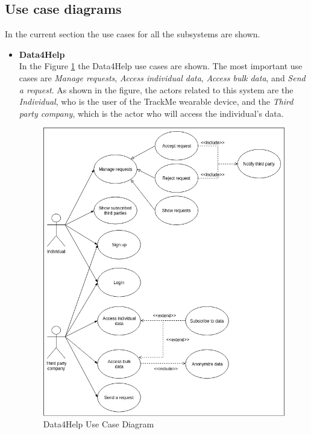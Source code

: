 \documentclass[hidelinks, 12pt]{report}
\begin{document}
	\subsection{Use case diagrams}
	In the current section the use cases for all the subsystems are shown.
	
	\begin{itemize}
		\item{\textbf{Data4Help}} \\
		In the Figure \ref{fig:d4h_use_cases} the Data4Help use cases are shown. The most important use cases are \textit{Manage requests}, \textit{Access individual data}, \textit{Access bulk data}, and \textit{Send a request}. As shown in the figure, the actors related to this system are the \textit{Individual}, who is the user of the TrackMe wearable device, and the \textit{Third party company}, which is the actor who will access the individual's data.
		
		\begin{figure}[H]
			\centering
			\includegraphics[scale=0.5]{Diagrams/d4h_use_cases.png}
			\caption[Data4Help Use Case Diagram]{Data4Help Use Case Diagram}
			\label{fig:d4h_use_cases}
		\end{figure}
		

\end{itemize}
\end{document}
